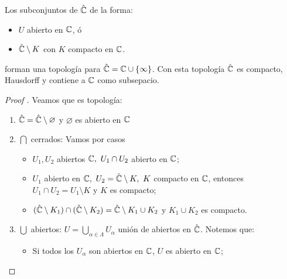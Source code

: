 \begin{prop}
	Los subconjuntos de $\hat{\mathbb{C}}$ de la forma:
	\begin{itemize}
		\item $U$ abierto en $\mathbb{C}$, ó

		\item $\hat{\mathbb{C}} \setminus K$ con $K$ compacto en $\mathbb{C}$.
	\end{itemize}
	forman una topología para $\hat{\mathbb{C}} = \mathbb{C} \cup \{\infty\}$. Con esta topología $\hat{\mathbb{C}}$ es compacto, Hausdorff y contiene a $\mathbb{C}$ como subsepacio.
\end{prop}
\begin{proof}[Proof ]
	Veamos que es topología: 
	\begin{enumerate} 
		\item $\hat{\mathbb{C}} = \hat{\mathbb{C}} \setminus \varnothing$ y $\varnothing$ es abierto en $\mathbb{C}$
		
		\item $\bigcap$ cerrados: Vamos por casos
		\begin{itemize}
			\item $U_{1}, U_{2}$ abiertos $\mathbb{C},\ U_{1} \cap U_{2}$ abierto en $\mathbb{C}$;

			\item $U_{1}$ abierto en $\mathbb{C},\ U_{2} = \hat{\mathbb{C}} \setminus K,\ K$ compacto en $\mathbb{C}$, entonces $U_{1} \cap U_{2} = U_{1} \setminus K$ y $K$ es compacto;

			\item $(\hat{\mathbb{C}} \setminus K_{1}) \cap (\hat{\mathbb{C}} \setminus K_{2}) = \hat{\mathbb{C}} \setminus K_{1} \cup K_{2}$ y $K_{1} \cup K_{2}$ es compacto.
		\end{itemize}
		
		\item $\bigcup$ abiertos: $U = \bigcup_{\alpha\in\Lambda} U_{\alpha}$ unión de abiertos en $\hat{\mathbb{C}}$. Notemos que:
		\begin{itemize}
			\item Si todos los $U_{\alpha}$ son abiertos en $\mathbb{C}$, $U$ es abierto en $\mathbb{C}$;


\end{itemize}
\end{enumerate}
\end{proof}
